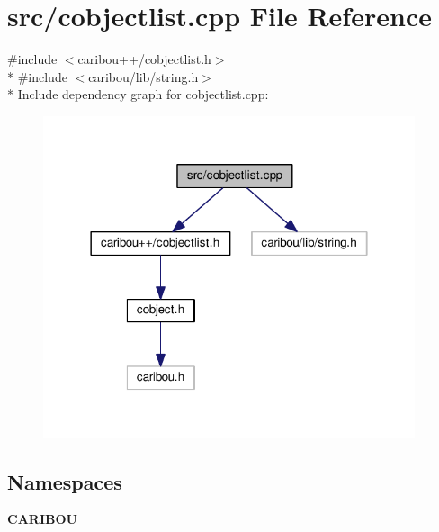 \section{src/cobjectlist.cpp File Reference}
\label{cobjectlist_8cpp}
{\ttfamily \#include $<$caribou++/cobjectlist.\+h$>$}\\*
{\ttfamily \#include $<$caribou/lib/string.\+h$>$}\\*
Include dependency graph for cobjectlist.\+cpp\+:
\nopagebreak
\begin{figure}[H]
\begin{center}
\leavevmode
\includegraphics[width=310pt]{cobjectlist_8cpp__incl}
\end{center}
\end{figure}
\subsection*{Namespaces}
\begin{DoxyCompactItemize}
\item 
 {\bf C\+A\+R\+I\+B\+OU}
\end{DoxyCompactItemize}
